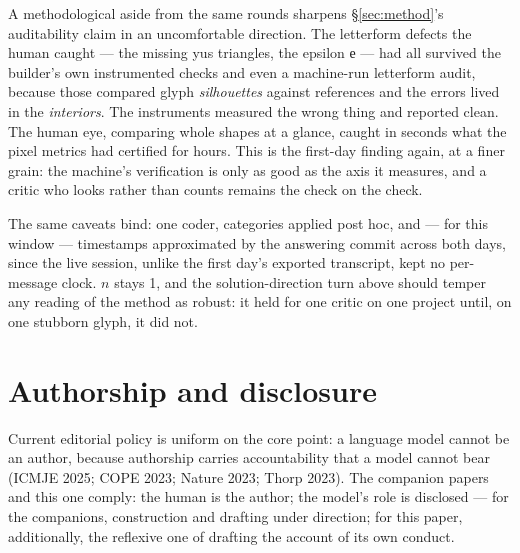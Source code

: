 \documentclass[12pt]{article}
\newcommand{\cz}[1]{{\chu #1}}
\begin{document}
A methodological aside from the same rounds sharpens \S\ref{sec:method}'s auditability claim in an uncomfortable direction. The letterform defects the human caught — the missing yus triangles, the epsilon \cz{е} — had all survived the builder's own instrumented checks and even a machine-run letterform audit, because those compared glyph \emph{silhouettes} against references and the errors lived in the \emph{interiors}. The instruments measured the wrong thing and reported clean. The human eye, comparing whole shapes at a glance, caught in seconds what the pixel metrics had certified for hours. This is the first-day finding again, at a finer grain: the machine's verification is only as good as the axis it measures, and a critic who looks rather than counts remains the check on the check.

The same caveats bind: one coder, categories applied post hoc, and — for this window — timestamps approximated by the answering commit across both days, since the live session, unlike the first day's exported transcript, kept no per-message clock. $n$ stays 1, and the solution-direction turn above should temper any reading of the method as robust: it held for one critic on one project until, on one stubborn glyph, it did not.

\section{Authorship and disclosure}\label{sec:authorship}

Current editorial policy is uniform on the core point: a language model cannot be an author, because authorship carries accountability that a model cannot bear (ICMJE 2025; COPE 2023; Nature 2023; Thorp 2023). The companion papers and this one comply: the human is the author; the model's role is disclosed — for the companions, construction and drafting under direction; for this paper, additionally, the reflexive one of drafting the account of its own conduct.
\end{document}
